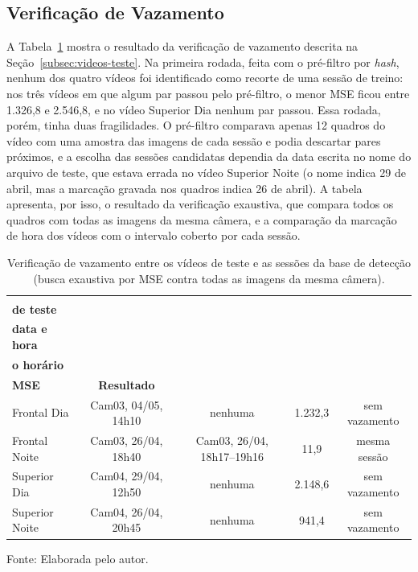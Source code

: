 \subsection{Verificação de Vazamento}
\label{subsec:res-vazamento}

A Tabela~\ref{tab:res-vazamento} mostra o resultado da verificação de vazamento descrita na Seção~\ref{subsec:videos-teste}. Na primeira rodada, feita com o pré-filtro por \textit{hash}, nenhum dos quatro vídeos foi identificado como recorte de uma sessão de treino: nos três vídeos em que algum par passou pelo pré-filtro, o menor MSE ficou entre 1.326,8 e 2.546,8, e no vídeo Superior Dia nenhum par passou. Essa rodada, porém, tinha duas fragilidades. O pré-filtro comparava apenas 12 quadros do vídeo com uma amostra das imagens de cada sessão e podia descartar pares próximos, e a escolha das sessões candidatas dependia da data escrita no nome do arquivo de teste, que estava errada no vídeo Superior Noite (o nome indica 29 de abril, mas a marcação gravada nos quadros indica 26 de abril). A tabela apresenta, por isso, o resultado da verificação exaustiva, que compara todos os quadros com todas as imagens da mesma câmera, e a comparação da marcação de hora dos vídeos com o intervalo coberto por cada sessão.

\begin{table}[htb]
\centering
\caption{Verificação de vazamento entre os vídeos de teste e as sessões da base de detecção (busca exaustiva por MSE contra todas as imagens da mesma câmera).}
\label{tab:res-vazamento}
\footnotesize
\begin{tabular}{lcccc}
\hline
\shortstack{\textbf{Vídeo}\\\textbf{de teste}} & \shortstack{\textbf{Câmera,}\\\textbf{data e hora}} & \shortstack{\textbf{Sessão que cobre}\\\textbf{o horário}} & \shortstack{\textbf{Menor}\\\textbf{MSE}} & \textbf{Resultado} \\
\hline
Frontal Dia & Cam03, 04/05, 14h10 & nenhuma & 1.232,3 & sem vazamento \\
Frontal Noite & Cam03, 26/04, 18h40 & Cam03, 26/04, 18h17--19h16 & 11,9 & mesma sessão \\
Superior Dia & Cam04, 29/04, 12h50 & nenhuma & 2.148,6 & sem vazamento \\
Superior Noite & Cam04, 26/04, 20h45 & nenhuma & 941,4 & sem vazamento \\
\hline
\end{tabular}

\vspace{0.2cm}
\normalsize
Fonte: Elaborada pelo autor.
\end{table}

